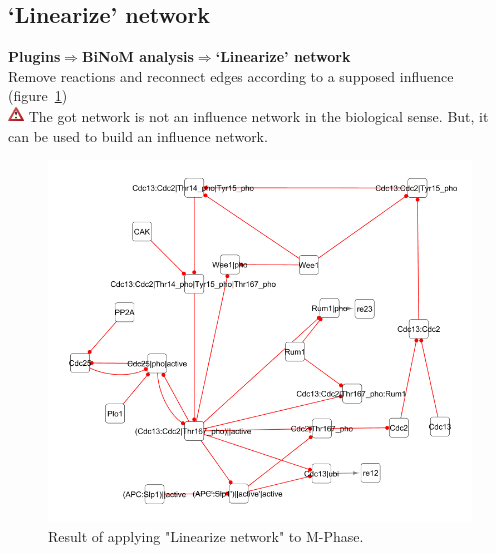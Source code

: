 \subsection{‘Linearize’ network}
\textbf{Plugins$\Rightarrow$BiNoM analysis$\Rightarrow$‘Linearize’ network}\\
Remove reactions and reconnect edges according to a supposed influence (figure~\ref{Linearized_Network_M-Phase})\\
\includegraphics[width=12pt,height=12pt]{graphics/warning} The got network is not an influence network in the biological sense. But, it can be used to build an influence network.
\begin{figure}
\centering
\includegraphics[width=14 cm]{graphics/Linearized_Network_M-Phase}
\caption{Result of applying "Linearize network" to M-Phase.}
\label{Linearized_Network_M-Phase}
\end{figure}


